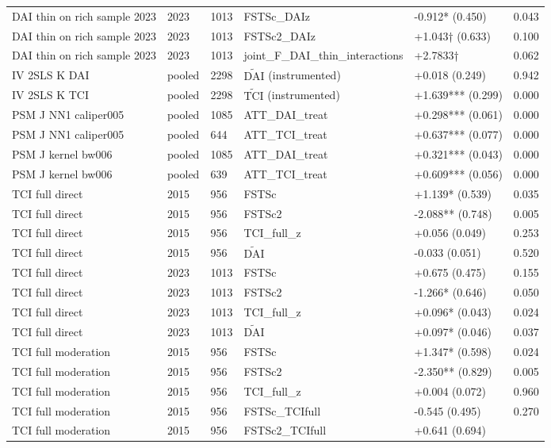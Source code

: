 \documentclass[12pt,a4paper]{article}
\begin{document}
\begin{longtable}[]{@{}llllll@{}}
DAI thin on rich sample 2023 & 2023 & 1013 & FSTSc\_DAIz & -0.912*
(0.450) & 0.043 \\
DAI thin on rich sample 2023 & 2023 & 1013 & FSTSc2\_DAIz & +1.043†
(0.633) & 0.100 \\
DAI thin on rich sample 2023 & 2023 & 1013 &
joint\_F\_DAI\_thin\_interactions & +2.7833† & 0.062 \\
IV 2SLS K DAI & pooled & 2298 & \(\tilde{\mathrm{DAI}}\) (instrumented)
& +0.018 (0.249) & 0.942 \\
IV 2SLS K TCI & pooled & 2298 & \(\tilde{\mathrm{TCI}}\) (instrumented)
& +1.639*** (0.299) & 0.000 \\
PSM J NN1 caliper005 & pooled & 1085 & ATT\_DAI\_treat & +0.298***
(0.061) & 0.000 \\
PSM J NN1 caliper005 & pooled & 644 & ATT\_TCI\_treat & +0.637***
(0.077) & 0.000 \\
PSM J kernel bw006 & pooled & 1085 & ATT\_DAI\_treat & +0.321*** (0.043)
& 0.000 \\
PSM J kernel bw006 & pooled & 639 & ATT\_TCI\_treat & +0.609*** (0.056)
& 0.000 \\
TCI full direct & 2015 & 956 & FSTSc & +1.139* (0.539) & 0.035 \\
TCI full direct & 2015 & 956 & FSTSc2 & -2.088** (0.748) & 0.005 \\
TCI full direct & 2015 & 956 & TCI\_full\_z & +0.056 (0.049) & 0.253 \\
TCI full direct & 2015 & 956 & \(\tilde{\mathrm{DAI}}\) & -0.033 (0.051)
& 0.520 \\
TCI full direct & 2023 & 1013 & FSTSc & +0.675 (0.475) & 0.155 \\
TCI full direct & 2023 & 1013 & FSTSc2 & -1.266* (0.646) & 0.050 \\
TCI full direct & 2023 & 1013 & TCI\_full\_z & +0.096* (0.043) &
0.024 \\
TCI full direct & 2023 & 1013 & \(\tilde{\mathrm{DAI}}\) & +0.097*
(0.046) & 0.037 \\
TCI full moderation & 2015 & 956 & FSTSc & +1.347* (0.598) & 0.024 \\
TCI full moderation & 2015 & 956 & FSTSc2 & -2.350** (0.829) & 0.005 \\
TCI full moderation & 2015 & 956 & TCI\_full\_z & +0.004 (0.072) &
0.960 \\
TCI full moderation & 2015 & 956 & FSTSc\_TCIfull & -0.545 (0.495) &
0.270 \\
TCI full moderation & 2015 & 956 & FSTSc2\_TCIfull & +0.641 (0.694) &

\end{longtable}
\end{document}
